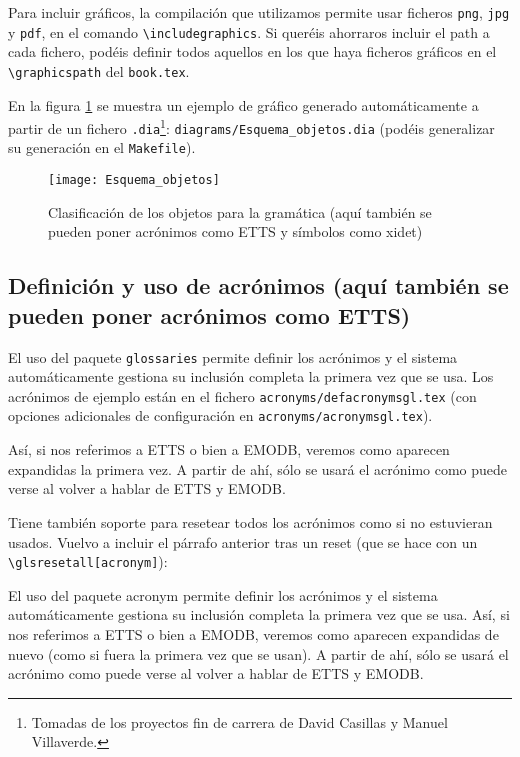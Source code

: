 {  Para incluir gráficos, la compilación que utilizamos permite usar ficheros \texttt{png}, \texttt{jpg} y \texttt{pdf}, en el comando \texttt{\textbackslash{}includegraphics}. Si queréis ahorraros incluir el path a cada fichero, podéis definir todos aquellos en los que haya ficheros gráficos en el \texttt{\textbackslash{}graphicspath} del \texttt{book.tex}.

  En la figura \ref{fig:fig_clobj} se muestra un ejemplo de gráfico generado automáticamente a partir de un fichero \texttt{.dia}\footnote{Tomadas de los proyectos fin de carrera de David Casillas y Manuel Villaverde.}: \texttt{diagrams/Esquema\_objetos.dia} (podéis generalizar su generación en el \texttt{Makefile}).

  \begin{figure}[tphb]
    \centering \texttt{[image: Esquema\_objetos]}
    \caption{Clasificación de los objetos para la gramática (aquí también se pueden poner acrónimos como \acs{ETTS} y símbolos como \ac{xidet})}
    \label{fig:fig_clobj}
  \end{figure}


  \subsection{Definición y uso de acrónimos (aquí también se pueden poner acrónimos como \acs{ETTS})}
  \label{sec:uso-de-acronimos}

  El uso del paquete \texttt{glossaries} permite definir los acrónimos y el sistema automáticamente gestiona su inclusión completa la primera vez que se usa. Los acrónimos de ejemplo están en el fichero \texttt{acronyms/defacronymsgl.tex} (con opciones adicionales de configuración en \texttt{acronyms/acronymsgl.tex}).

  Así, si nos referimos a \ac{ETTS} o bien a \ac{EMODB}, veremos como aparecen expandidas la primera vez. A partir de ahí, sólo se usará el acrónimo como puede verse al volver a hablar de \ac{ETTS} y \ac{EMODB}.

  Tiene también soporte para resetear todos los acrónimos como si no estuvieran usados. Vuelvo a incluir el párrafo anterior tras un reset (que se hace con un \texttt{\textbackslash{}glsresetall[acronym]}):

  \glsresetall[acronym]

  El uso del paquete acronym permite definir los acrónimos y el sistema automáticamente gestiona su inclusión completa la primera vez que se usa. Así, si nos referimos a \ac{ETTS} o bien a \ac{EMODB}, veremos como aparecen expandidas de nuevo (como si fuera la primera vez que se usan). A partir de ahí, sólo se usará el acrónimo como puede verse al volver a hablar de \ac{ETTS} y \ac{EMODB}.

}
